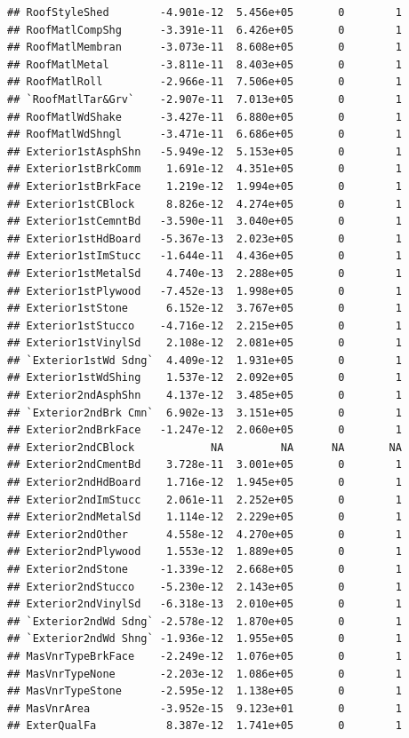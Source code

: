 \documentclass[
]{article}
\begin{document}
\begin{verbatim}
## RoofStyleShed        -4.901e-12  5.456e+05       0        1
## RoofMatlCompShg      -3.391e-11  6.426e+05       0        1
## RoofMatlMembran      -3.073e-11  8.608e+05       0        1
## RoofMatlMetal        -3.811e-11  8.403e+05       0        1
## RoofMatlRoll         -2.966e-11  7.506e+05       0        1
## `RoofMatlTar&Grv`    -2.907e-11  7.013e+05       0        1
## RoofMatlWdShake      -3.427e-11  6.880e+05       0        1
## RoofMatlWdShngl      -3.471e-11  6.686e+05       0        1
## Exterior1stAsphShn   -5.949e-12  5.153e+05       0        1
## Exterior1stBrkComm    1.691e-12  4.351e+05       0        1
## Exterior1stBrkFace    1.219e-12  1.994e+05       0        1
## Exterior1stCBlock     8.826e-12  4.274e+05       0        1
## Exterior1stCemntBd   -3.590e-11  3.040e+05       0        1
## Exterior1stHdBoard   -5.367e-13  2.023e+05       0        1
## Exterior1stImStucc   -1.644e-11  4.436e+05       0        1
## Exterior1stMetalSd    4.740e-13  2.288e+05       0        1
## Exterior1stPlywood   -7.452e-13  1.998e+05       0        1
## Exterior1stStone      6.152e-12  3.767e+05       0        1
## Exterior1stStucco    -4.716e-12  2.215e+05       0        1
## Exterior1stVinylSd    2.108e-12  2.081e+05       0        1
## `Exterior1stWd Sdng`  4.409e-12  1.931e+05       0        1
## Exterior1stWdShing    1.537e-12  2.092e+05       0        1
## Exterior2ndAsphShn    4.137e-12  3.485e+05       0        1
## `Exterior2ndBrk Cmn`  6.902e-13  3.151e+05       0        1
## Exterior2ndBrkFace   -1.247e-12  2.060e+05       0        1
## Exterior2ndCBlock            NA         NA      NA       NA
## Exterior2ndCmentBd    3.728e-11  3.001e+05       0        1
## Exterior2ndHdBoard    1.716e-12  1.945e+05       0        1
## Exterior2ndImStucc    2.061e-11  2.252e+05       0        1
## Exterior2ndMetalSd    1.114e-12  2.229e+05       0        1
## Exterior2ndOther      4.558e-12  4.270e+05       0        1
## Exterior2ndPlywood    1.553e-12  1.889e+05       0        1
## Exterior2ndStone     -1.339e-12  2.668e+05       0        1
## Exterior2ndStucco    -5.230e-12  2.143e+05       0        1
## Exterior2ndVinylSd   -6.318e-13  2.010e+05       0        1
## `Exterior2ndWd Sdng` -2.578e-12  1.870e+05       0        1
## `Exterior2ndWd Shng` -1.936e-12  1.955e+05       0        1
## MasVnrTypeBrkFace    -2.249e-12  1.076e+05       0        1
## MasVnrTypeNone       -2.203e-12  1.086e+05       0        1
## MasVnrTypeStone      -2.595e-12  1.138e+05       0        1
## MasVnrArea           -3.952e-15  9.123e+01       0        1
## ExterQualFa           8.387e-12  1.741e+05       0        1

\end{verbatim}
\end{document}
